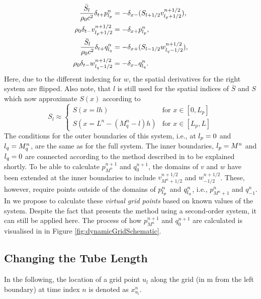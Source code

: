 \begin{subequations}\label{eq:firstOrderPairs}
    \begin{align}
        \frac{\bar S_{l}}{\rho_0 c^2}\delta_{t+}p_{l_p}^n &= -\delta_{x-}(S_{{l}+1/2}v_{{l_p}+1/2}^{n+1/2}),\label{eq:discPressureP}\\
        \rho_0 \delta_{t-}v_{{l_p}+1/2}^{n+1/2}&=-\delta_{x+}p_{l_p}^n,\label{eq:discVelocityV}\\
        \frac{\bar S_{l}}{\rho_0 c^2}\delta_{t+}q_{l_q}^n &= -\delta_{x+}(S_{{l}-1/2}w_{{l_q}-1/2}^{n+1/2}),\label{eq:discPressureQ}\\
        \rho_0 \delta_{t-}w_{{l_q}-1/2}^{n+1/2}&=-\delta_{x-}q_{l_q}^n.\label{eq:discVelocityW}
    \end{align}
\end{subequations}
Here, due to the different indexing for $w$, the spatial derivatives for the right system are flipped. Also note, that $l$ is still used for the spatial indices of $\bar S$ and $S$ which now approximate $S(x)$ according to
\begin{equation}
S_l \approx \begin{cases}
     S(x=lh) & \text{for } x\in [0, L_p]\\
     S(x=L^n-(M_q^n-l)h) & \text{for } x\in [L_p, L]
\end{cases}
\end{equation} 
The conditions for the outer boundaries of this system, i.e., at ${l_p} = 0$ and ${l_q} = M_q^n$, are the same as for the full system. The inner boundaries, ${l_p} = M^n$ and ${l_q} = 0$ are connected according to the method described in \cite{Willemsen2021} to be explained shortly.
To be able to calculate $p_{M^n}^{n+1}$ and $q_0^{n+1}$, the domains of $v$ and $w$ have been extended at the inner boundaries to include $v_{M^n+1/2}^{n+1/2}$ and $w_{-1/2}^{n+1/2}$. These, however, require points outside of the domains of $p_{l_p}^n$ and $q_{l_q}^n$, i.e., $p_{M^n+1}^n$ and $q_{-1}^n$. In \cite{Willemsen2021} we propose to calculate these \textit{virtual grid points} based on known values of the system. Despite the fact that \cite{Willemsen2021} presents the method using a second-order system, it can still be applied here. The process of how $p_{M^n}^{n+1}$ and $q_0^{n+1}$ are calculated is visualised in in Figure \ref{fig:dynamicGridSchematic}.

\subsection{Changing the Tube Length}
In the following, the location of a grid point $u_l$ along the grid (in m from the left boundary) at time index $n$ is denoted as $x_{u_l}^n$.

